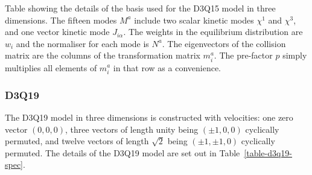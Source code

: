 \begin{table}[t]
\caption{Table showing the details of the basis used for the D3Q15 model
in three dimensions. The fifteen modes $M^a$ include two scalar kinetic
modes $\chi^1$ and $\chi^3$, and one vector kinetic mode $J_{i\alpha}$.
The weights in the equilibrium distribution are $w_i$ and the normaliser
for each mode is $N^a$. The eigenvectors of the collision matrix are the
columns of the transformation matrix $m_i^a$. The pre-factor $p$ simply
multiplies all elements of $m_i^a$ in that row as a convenience.
\label{table-d3q15-spec}
}
\end{table}


\subsubsection{D3Q19}

The D3Q19 model in three dimensions is constructed with velocities:
one zero vector $(0,0,0)$, three vectors of length unity being
$(\pm 1, 0, 0)$ cyclically permuted, and twelve vectors of length
$\sqrt{2}$ being $(\pm 1, \pm 1, 0)$ cyclically permuted. The
details of the D3Q19 model are set out in Table~\ref{table-d3q19-spec}.

